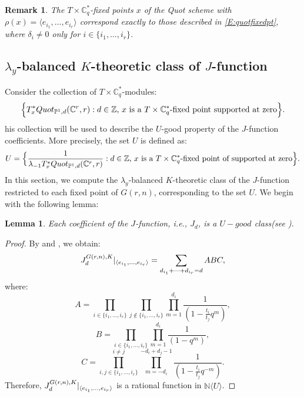 \documentclass{amsart}
\newtheorem{lemma}[thm]{Lemma}
\newtheorem{remark}[thm]{Remark}
\begin{document}
\begin{remark}\label{Remark}
    The $T \times \mathbb{C}_q^*$-fixed points $x$ of the Quot scheme with  $\rho(x) = \langle e_{i_1},\dots,e_{i_r} \rangle$ correspond exactly to those described in \eqref{E:quotfixedpt}, where $\delta_i \ne 0$ only for $i \in \{i_1,\dots,i_r\}$.

\end{remark}

\subsection{{\bf $\lambda_y$-balanced $K$-theoretic class} of $J$-function} \label{lambda calculation}
Consider the collection of $T \times \mathbb{C}_q^*$-modules:
\[
\Bigl\{T^*_x Quot_{\mathbb{P}^1,d}(\mathbb{C}^r,r) : \text{$d \in \mathbb{Z}$, $x$ is a $T \times \mathbb{C}_q^*$-fixed point supported at zero}\Bigr \}.
\]
his collection will be used to describe the $U$-good property of the $J$-function coefficients. More precisely, the set $U$ is defined as:
\[
U = \Bigl\{\frac{1}{\lambda_{-1}T^*_xQuot_{\mathbb{P}^1,d}(\mathbb{C}^r,r)}: \text{$d \in \mathbb{Z}$, $x$ is a $T \times \mathbb{C}_q^*$-fixed point of supported at zero}\Bigr\}.
\]
In this section, we compute the $\lambda_y$-balanced $K$-theoretic class of the $J$-function restricted to each fixed point of $G(r,n)$, corresponding to the set $U$. We begin with the following lemma:
\begin{lemma}
    Each coefficient of the $J$-function, i.e., $J_d$, is a $U-good$ class(see ).
\end{lemma}
\begin{proof}
    By  and , we obtain:
    \[
{J_d^{G(r,n),K}}\arrowvert_{\langle e_{i_1},\dots,e_{i_r}\rangle} = \sum_{d_{i_1}+\dots+d_{i_r}=d}ABC,
\]
where:
\[
A = \prod_{i \in \{i_1,\dots,i_r\}} \prod_{j \notin \{i_1,\dots,i_r\}} \prod_{m=1}^{d_i} \frac{1}{(1 - \frac{t_i}{t_j} q^{m})},
\]
\[
B = \prod_{i \in \{i_1,\dots,i_r\}}\prod_{m=1}^{d_i}\frac{1}{(1-q^{m})},
\]
\[
C = \prod_{i,j \in \{i_1,\dots,i_r\}}^{i \ne j}\prod_{m=-d_i}^{-d_i+d_j-1}\frac{1}{(1-{\frac{t_i}{t_j}}q^{-m})}.
\]
 Therefore, ${J_d^{G(r,n),K}}\arrowvert_{\langle e_{i_1},\dots,e_{i_r}\rangle}$ is a rational function in $\mathbb{N}\langle U \rangle$.
\end{proof}
\end{document}

